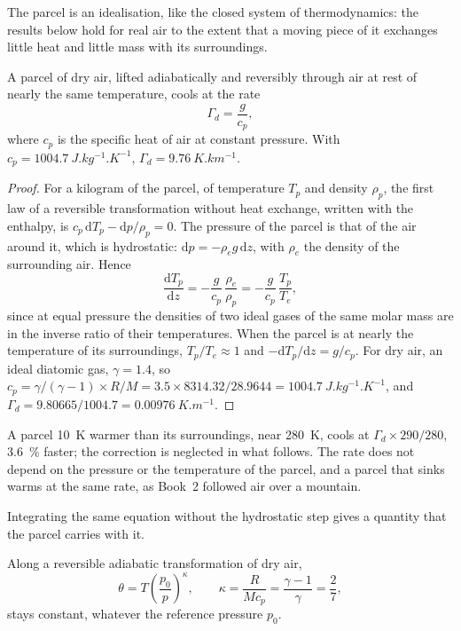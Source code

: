 The parcel is an idealisation, like the closed system of thermodynamics: the
results below hold for real air to the extent that a moving piece of it exchanges
little heat and little mass with its surroundings.

\begin{theorem}\label{thm:b1:fluid-envelopes-structure:dry-adiabatic}
A parcel of dry air, lifted adiabatically and reversibly through air at rest of
nearly the same temperature, cools at the rate
\[
  \Gamma_d = \frac{g}{c_p},
\]
where $c_p$ is the specific heat of air at constant pressure. With $c_p =
\qty{1004.7}{J.kg^{-1}.K^{-1}}$, $\Gamma_d = \qty{9.76}{K.km^{-1}}$.
\end{theorem}

\begin{proof}
For a kilogram of the parcel, of temperature $T_p$ and density $\rho_p$, the
first law of a reversible transformation without heat exchange, written with the
enthalpy, is $c_p\,\mathrm dT_p - \mathrm dp/\rho_p = 0$. The pressure of the
parcel is that of the air around it, which is hydrostatic: $\mathrm dp = -\rho_e
g\,\mathrm dz$, with $\rho_e$ the density of the surrounding air. Hence
\[
  \frac{\mathrm dT_p}{\mathrm dz} = -\frac{g}{c_p}\,\frac{\rho_e}{\rho_p}
  = -\frac{g}{c_p}\,\frac{T_p}{T_e},
\]
since at equal pressure the densities of two ideal gases of the same molar mass
are in the inverse ratio of their temperatures. When the parcel is at nearly the
temperature of its surroundings, $T_p/T_e \approx 1$ and $-\mathrm dT_p/\mathrm dz
= g/c_p$. For dry air, an ideal diatomic gas, $\gamma = 1.4$, so $c_p =
\gamma/(\gamma - 1) \times R/M = 3.5 \times 8314.32/28.9644 =
\qty{1004.7}{J.kg^{-1}.K^{-1}}$, and $\Gamma_d = 9.80665/1004.7 =
\qty{0.00976}{K.m^{-1}}$.
\end{proof}

A parcel \qty{10}{K} warmer than its surroundings, near \qty{280}{K}, cools at
$\Gamma_d \times 290/280$, \qty{3.6}{\percent} faster; the correction is
neglected in what follows. The rate does not depend on the pressure or the
temperature of the parcel, and a parcel that sinks warms at the same rate, as
Book~2 followed air over a mountain.

Integrating the same equation without the hydrostatic step gives a quantity that
the parcel carries with it.

\begin{proposition}\label{prop:b1:fluid-envelopes-structure:theta}
Along a reversible adiabatic transformation of dry air,
\[
  \theta = T\left(\frac{p_0}{p}\right)^{\kappa},\qquad \kappa = \frac{R}{Mc_p} =
  \frac{\gamma - 1}{\gamma} = \frac{2}{7},
\]
stays constant, whatever the reference pressure $p_0$.
\end{proposition}

